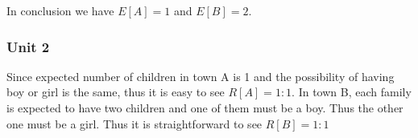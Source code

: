 \noindent In conclusion we have $E[A]=1$ and $E[B]=2$.
\subsubsection{Unit 2}
Since expected number of children in town A is 1 and the possibility of having boy or girl is the same, thus it is easy to see $R[A]=1:1$. 
In town B, each family is expected to have two children and one of them must be a boy. Thus the other one must be a girl. Thus it is straightforward to see $R[B]=1:1$



